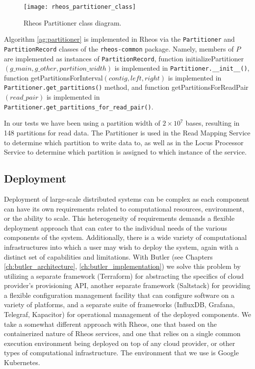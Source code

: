 \begin{figure}[h!]
    \texttt{[image: rheos\_partitioner\_class]}
    \centering
    \caption {Rheos Partitioner class diagram.}
    \label{fig:rheos_partitioner_class}
\end{figure}

Algorithm \ref{ag:partitioner} is implemented in Rheos via the \texttt{Partitioner} and \texttt{PartitionRecord} classes of the \texttt{rheos-common} package. Namely, members of $P$ are implemented as instances of \texttt{PartitionRecord}, function {\sc initializePartitioner}$(g\_main, g\_other, partition\_width)$ is implemented in \texttt{Partitioner.__init__()}, function {\sc getPartitionsForInterval}$(contig, left, right)$ is implemented in \texttt{Partitioner.get_partitions()} method, and function {\sc getPartitionsForReadPair}$(read\_pair)$ is implemented in \texttt{Partitioner.get_partitions_for_read_pair()}.

In our tests we have been using a partition width of $2\times10^7$ bases, resulting in 148 partitions for read data. The Partitioner is used in the Read Mapping Service to determine which partition to write data to, as well as in the Locus Processor Service to determine which partition is assigned to which instance of the service.

\subsection{Deployment}

Deployment of large-scale distributed systems can be complex as each component can have its own requirements related to computational resources, environment, or the ability to scale. This heterogeneity of requirements demands a flexible deployment approach that can cater to the individual needs of the various components of the system. Additionally, there is a wide variety of computational infrastructures into which a user may wish to deploy the system, again with a distinct set of capabilities and limitations. With Butler (see Chapters \ref{ch:butler_architecture}, \ref{ch:butler_implementation}) we solve this problem by utilizing a separate framework (Terraform) for abstracting the specifics of cloud provider's provisioning API, another separate framework (Saltstack) for providing a flexible configuration management facility that can configure software on a variety of platforms, and a separate suite of frameworks (InfluxDB, Grafana, Telegraf, Kapacitor) for operational management of the deployed components. We take a somewhat different approach with Rheos, one that based on the containerized nature of Rheos services, and one that relies on a single common execution environment being deployed on top of any cloud provider, or other types of computational infrastructure. The environment that we use is Google Kubernetes\autocite{bernstein2014containers}. 


